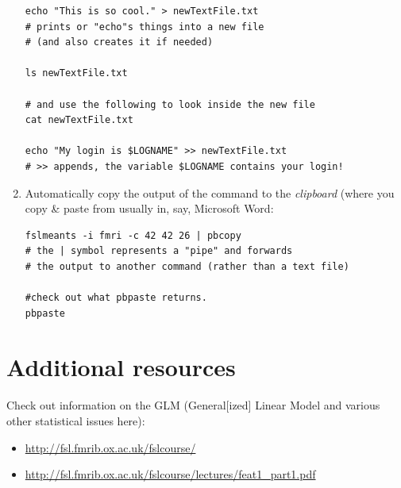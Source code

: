 \begin{enumerate}
\begin{lstlisting}
echo "This is so cool." > newTextFile.txt
# prints or "echo"s things into a new file 
# (and also creates it if needed)

ls newTextFile.txt

# and use the following to look inside the new file
cat newTextFile.txt

echo "My login is $LOGNAME" >> newTextFile.txt
# >> appends, the variable $LOGNAME contains your login!
\end{lstlisting}

\item Automatically copy the output of the command to the \emph{clipboard} (where you copy \& paste from usually in, say, Microsoft Word:

\begin{lstlisting}
fslmeants -i fmri -c 42 42 26 | pbcopy
# the | symbol represents a "pipe" and forwards
# the output to another command (rather than a text file)

#check out what pbpaste returns.
pbpaste 
\end{lstlisting}


\end{enumerate}

\section{Additional resources}
Check out information on the GLM (General[ized] Linear Model and various other statistical issues here):

\begin{itemize}
\item \url{http://fsl.fmrib.ox.ac.uk/fslcourse/} 
\item \url{http://fsl.fmrib.ox.ac.uk/fslcourse/lectures/feat1_part1.pdf}
\end{itemize}

  



